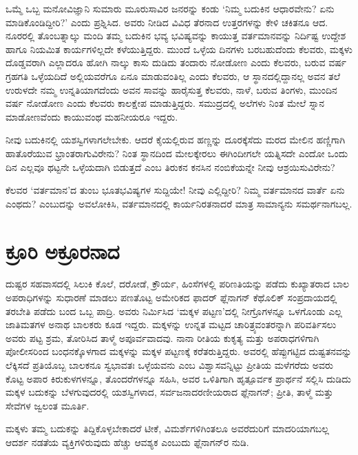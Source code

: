 ಒಮ್ಮೆ ಒಬ್ಬ ಮನೋವಿಜ್ಞಾನಿ ಸುಮಾರು ಮೂರುಸಾವಿರ ಜನರನ್ನು ಕಂಡು ‘ನಿಮ್ಮ ಬದುಕಿನ ಆಧಾರವೇನು? ಏನು ಮಾಡಿಕೊಂಡಿದ್ದೀರಿ?’ ಎಂದು ಪ್ರಶ್ನಿಸಿದ. ಅವರು ನೀಡಿದ ವಿವಿಧ ತೆರನಾದ ಉತ್ತರಗಳನ್ನು ಕೇಳಿ ಚಕಿತನೂ ಆದ. ನೂರರಲ್ಲಿ ತೊಂಬತ್ನಾಲ್ಕು ಮಂದಿ ತಮ್ಮ ಬದುಕಿನ ಭವ್ಯ ಭವಿಷ್ಯವನ್ನು ಕಾಯುತ್ತ ವರ್ತಮಾನವನ್ನು ನಿರ್ದಿಷ್ಟ ಉದ್ದೇಶ ಹಾಗೂ ನಿಯಮಿತ ಕಾರ್ಯಗಳಿಲ್ಲದೇ ಕಳೆಯುತ್ತಿದ್ದರು. ಮುಂದೆ ಒಳ್ಳೆಯ ದಿನಗಳು ಬರಬಹುದೆಂದು ಕೆಲವರು, ಮಕ್ಕಳು ದೊಡ್ಡವರಾಗಿ ಎಲ್ಲಾದರೂ ಹೋಗಿ ನಾಲ್ಕು ಕಾಸು ದುಡಿದು ತಂದಾರು ನೋಡೋಣ ಎಂದು ಕೆಲವರು, ಬರುವ ವರ್ಷ ಗ್ರಹಗತಿ ಒಳ್ಳೆಯದಿದೆ ಅಲ್ಲಿಯವರೆಗೂ ಏನೂ ಮಾಡು\-ವಂತಿಲ್ಲ ಎಂದು ಕೆಲವರು, ಆ ಸ್ಥಾನದಲ್ಲಿದ್ದಾನಲ್ಲ ಅವನ ತಲೆ ಉರುಳದೇ ನಮ್ಮ ಉನ್ನತಿಯಾಗದೆಂದು ಅವನ ಸಾವನ್ನು ಹಾರೈಸುತ್ತ ಕೆಲವರು, ನಾಳೆ, ಬರುವ ತಿಂಗಳು, ಮುಂದಿನ ವರ್ಷ ನೋಡೋಣ ಎಂದು ಕೆಲವರು ಕಾಲಕ್ಷೇಪ ಮಾಡುತ್ತಿದ್ದರು. ಸಮುದ್ರದಲ್ಲಿ ಅಲೆಗಳು ನಿಂತ ಮೇಲೆ ಸ್ನಾನ ಮಾಡೋಣವೆಂದು ಕಾಯುವಂಥ ಮಹನೀಯರೂ ಇದ್ದರು.

ನೀವು ಬದುಕಿನಲ್ಲಿ ಯಶಸ್ವಿಗಳಾಗಲೇಬೇಕು. ಆದರೆ ಕೈಯಲ್ಲಿರುವ ಹಣ್ಣನ್ನು ದೂರಕ್ಕೆಸೆದು ಮರದ ಮೇಲಿನ ಹಣ್ಣಿಗಾಗಿ ಹಾತೊರೆಯುವ ಭ್ರಾಂತರಾಗುವಿರೇನು? ನಿಂತ ಸ್ಥಾನದಿಂದ ಮೇಲಕ್ಕೇರಲು ಈಗಿಂದೀಗಲೇ ಯತ್ನಿಸದೇ ಎಂದೋ ಒಂದು ದಿನ ಎಲ್ಲವೂ ಥಟ್ಟನೇ ಒಳ್ಳೆಯದಾಗಿ ಬಿಡುತ್ತದೆ ಎಂಬ ತಿರುಕನ ಕನಸಿನ ನಂಬಿಕೆಯನ್ನೇ ನೀವು ಆಶ್ರಯಿಸುವಿರೇನು?

ಕೆಲವರ ‘ವರ್ತಮಾನ’ದ ತುಂಬ ಭೂತಭವಿಷ್ಯಗಳ ಸುದ್ದಿಯೇ! ನೀವು ಎಲ್ಲಿದ್ದೀರಿ? ನಿಮ್ಮ ವರ್ತಮಾನದ ವಾರ್ತೆ ಏನು ಎಂಥದು? ಎಂಬುದನ್ನು ಅವಲೋಕಿಸಿ, ವರ್ತಮಾನದಲ್ಲಿ ಕಾರ್ಯನಿರತನಾದರೆ ಮಾತ್ರ ಸಾಮಾನ್ಯನು ಸಮರ್ಥನಾಗಬಲ್ಲ.


\section*{ಕ್ರೂರಿ ಅಕ್ರೂರನಾದ}


ದುಷ್ಟರ ಸಹವಾಸದಲ್ಲಿ ಸಿಲುಕಿ ಕೊಲೆ, ದರೋಡೆ, ಕ್ರೌರ್ಯ, ಹಿಂಸೆಗಳಲ್ಲಿ ಪರಿಣತಿಯನ್ನು ಪಡೆದು ಕುಖ್ಯಾತರಾದ ಬಾಲ ಅಪರಾಧಿಗಳನ್ನು ಸುಧಾರಣೆ ಮಾಡಲು ಪಣತೊಟ್ಟ ಅಮೇರಿಕದ ಫಾದರ್ ಫ್ಲೆನಾಗನ್ ಕೆಥೊಲಿಕ್ ಸಂಪ್ರದಾಯದಲ್ಲಿ ತರಬೇತಿ ಪಡೆದು ಬಂದ ಒಬ್ಬ ಪಾದ್ರಿ. ಅವರು ನಿರ್ಮಿಸಿದ ‘ಮಕ್ಕಳ ಪಟ್ಟಣ’ದಲ್ಲಿ ನೀಗ್ರೊಗಳನ್ನೂ ಒಳಗೊಂಡು ಎಲ್ಲ ಜಾತಿಮತಗಳ ಅನಾಥ ಬಾಲಕರು ಕೂಡ ಇದ್ದರು. ಮಕ್ಕಳನ್ನು ಉನ್ನತ ಮಟ್ಟದ ಚಾರಿತ್ರ್ಯವಂತರನ್ನಾಗಿ ಪರಿವರ್ತಿಸಲು ಅವರು ಪಟ್ಟ ಶ್ರಮ, ತೋರಿಸಿದ ತಾಳ್ಮೆ ಅಪೂರ್ವವಾದವು. ನಾನಾ ರೀತಿಯ ಕುಕೃತ್ಯ ಮತ್ತು ಅಪರಾಧಗಳಿಗಾಗಿ ಪೋಲೀಸರಿಂದ ಬಂಧನಕ್ಕೊಳಗಾದ ಮಕ್ಕಳನ್ನು ಮಕ್ಕಳ ಪಟ್ಟಣಕ್ಕೆ ಕರೆ\-ತರು\-ತ್ತಿದ್ದರು. ಅವರಲ್ಲಿ ಹೆಪ್ಪುಗಟ್ಟಿದ ದುಷ್ಟತನವನ್ನು ಲೆಕ್ಕಿಸದೆ ಪ್ರತಿಯೊಬ್ಬ ಬಾಲಕನೂ ಸ್ವಭಾವತಃ ಒಳ್ಳೆಯವನು ಎಂಬ ವಿಶ್ವಾಸವನ್ನಿಟ್ಟು ಪ್ರೀತಿಯ ಮಳೆಗರೆದು ಅವರು ಕೊಟ್ಟ ಅಪಾರ ಕಿರುಕುಳಗಳನ್ನೂ, ತೊಂದರೆಗಳನ್ನೂ ಸಹಿಸಿ, ಅವರ ಒಳಿತಿಗಾಗಿ ಹೃತ್ಪೂರ್ವಕ ಪ್ರಾರ್ಥನೆ ಸಲ್ಲಿಸಿ ದುಡಿದು ಮಕ್ಕಳ ಬದುಕನ್ನು ಬೆಳಗುವುದರಲ್ಲಿ ಯಶಸ್ವಿಗಳಾದ, ಸರ್ವಜನಾದರಣೀಯರಾದ ಫ್ಲೆನಾಗನ್​; ಪ್ರೀತಿ, ತಾಳ್ಮೆ ಮತ್ತು ಸೇವೆಗಳ ಜ್ವಲಂತ ಮೂರ್ತಿ.

ಮಕ್ಕಳು ತಮ್ಮ ಬದುಕನ್ನು ತಿದ್ದಿಕೊಳ್ಳಬೇಕಾದರೆ ಟೀಕೆ, ವಿಮರ್ಶೆಗಳಿಗಿಂತಲೂ ಅವರೆದುರಿಗೆ ಮಾದರಿಯಾಗಬಲ್ಲ ಆದರ್ಶ ನಡತೆಯ ವ್ಯಕ್ತಿಗಳಿರುವುದು ಹೆಚ್ಚು ಆವಶ್ಯಕ ಎಂಬುದು ಫ್ಲೆನಾಗನ್​ರ ನುಡಿ.

